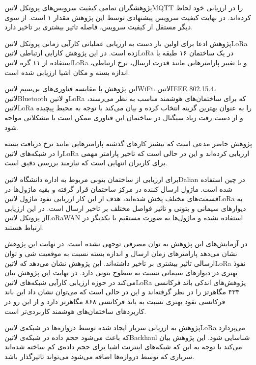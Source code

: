 پژوهشگران تمامی کیفیت سرویس‌های پروتکل ‌لاتین{MQTT} را در ارزیابی خود لحاظ کرده‌اند. در نهایت کیفیت سرویس پیشنهادی توسط
این پژوهش مقدار ۱ است. از سوی دیگر مستقل از کیفیت سرویس، فاصله تاثیر بیشتری بر تاخیر دارد.


پژوهش  ادعا برای اولین بار دست به ارزیابی عملیاتی کارآیی زمانی پروتکل ‌لاتین{LoRa} زده است.
در این پژوهش کارایی ارتباطی ‌لاتین{LoRa} در یک ساختمان ۱۶ طبقه با استفاده از ۱۱ گره ‌لاتین{LoRa}
و با تغییر پارامترهایی مانند قدرت ارسال، نرخ ارتباطی، اندازه بسته و مکان اشیا ارزیابی شده است.

این پژوهش با مقایسه فناوری‌های بی‌سیم ‌لاتین{WiFi}، ‌لاتین{IEEE 802.15.4}، ‌لاتین{Bluetooth}
و ‌لاتین{LoRa} که برای ساختمان‌های هوشمند مناسب به نظر می‌رسند، ‌لاتین{LoRa} را به عنوان بهترین گزینه انتخاب کرده
و بیان می‌کند با توجه به محیط پیچیده و از دست رفت زیاد سیگنال در ساختمان این فناوری ممکن است با مشکلاتی مواجه شود.

پژوهش حاضر مدعی است که بیشتر کارهای گذشته پارامترهایی مانند نرخ دریافت بسته را در شبکه‌های ‌لاتین{LoRa} ارزیابی کرده‌اند و این در حالی است
که تاخیر پارامتر مهمی برای کاربران انتهایی است که نیازمند بررسی دقیق است.

برای ارزیابی از ساختمان بتونی مربوط به اداره دانشگاه ‌لاتین{Dalian} در چین استفاده شده است. ماژول ارسال کننده در مرکز ساختمان قرار گرفته و بقیه ماژول‌ها
در قسمت‌های مختلف پخش شده‌اند، هدف از این کار ارزیابی نفود ماژول ‌لاتین{LoRa} به دیوارهای سیمانی و بتونی و تاثیر فواصل مختلف بر تاخیر ارسال است.
در این ارزیابی از پروتکل ‌لاتین{LoRaWAN} استفاده نشده و ماژول‌ها به صورت مستقیم با یکدیگر در ارتباط هستند.

در آزمایش‌های این پژوهش به توان مصرفی توجهی نشده است. در نهایت این پژوهش نشان می‌دهد پارامترهای زمان ارسال و اندازه بسته نسبت به موقعیت شی و توان ارسالی
تاثیر بیشتری بر تاخیر داشته‌اند. این پژوهش نشان می‌دهد که ‌لاتین{LoRa} نفوذ بهتری در دیوارهای سیمانی نسبت به سطوح بتونی دارد.
در نهایت این پژوهش بیان می‌کند در حوزه ارزیابی کارآیی شبکه‌های ‌لاتین{LoRa} پژوهش‌های اندکی باند فرکانسی ۴۳۴ مگاهرتز را در نظر گرفته‌اند و این در حالی است
که می‌توان نشان داد این باند فرکانسی نفوذ بهتری نسبت به باند فرکانسی ۸۶۸ مگاهرتز دارد و از این رو در کاربردهای ساختمان‌های هوشمند کاربردی‌تر است.


پژوهش  به ارزیابی سربار ایجاد شده توسط دروازه‌ها در شبکه‌ی ‌لاتین{LoRa}
می‌پردازد که باعث می‌شود حجم داده در شبکه‌ی ‌لاتین{Backhaul} شناسایی شود.
این پژوهش بیان می‌کند با توجه به این که شبکه‌های اینترنت اشیا برای حجم داده‌ی کم ساخته شده‌اند سرباری که توسط دروازه‌ها
اضافه می‌شود می‌تواند تاثیرگذار باشد.

